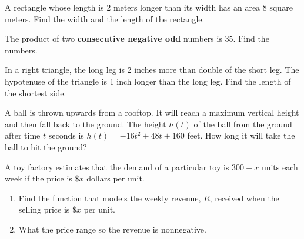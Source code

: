\begin{exercise}
A rectangle whose length is \(2\) meters longer than its width has an
area \(8\) square meters. Find the width and the length of the
rectangle.
\end{exercise}
\vspace*{5\baselineskip}

\begin{exercise}
The product of two \textbf{consecutive negative odd} numbers is \(35\).
Find the numbers.
\end{exercise}
\vspace*{5\baselineskip}

\begin{exercise}
In a right triangle, the long leg is 2 inches more than double of the
short leg. The hypotenuse of the triangle is 1 inch longer than the long
leg. Find the length of the shortest side.
\end{exercise}
\vspace*{5\baselineskip}

\begin{exercise}
A ball is thrown upwards from a rooftop. It will reach a maximum
vertical height and then fall back to the ground. The height \(h(t)\) of
the ball from the ground after time \(t\) seconds is
\(h(t)=-16t^2 + 48t + 160\) feet. How long it will take the ball to hit
the ground?
\end{exercise}

\vspace*{5\baselineskip}
\begin{exercise}
A toy factory estimates that the demand of a particular toy is
\(300 -x\) units each week if the price is \$\(x\) dollars per unit.

\begin{enumerate}

\item
  Find the function that models the weekly revenue, \(R\), received when
  the selling price is \$\(x\) per unit.
\item
  What the price range so the revenue is nonnegative.
\end{enumerate}
\end{exercise}


